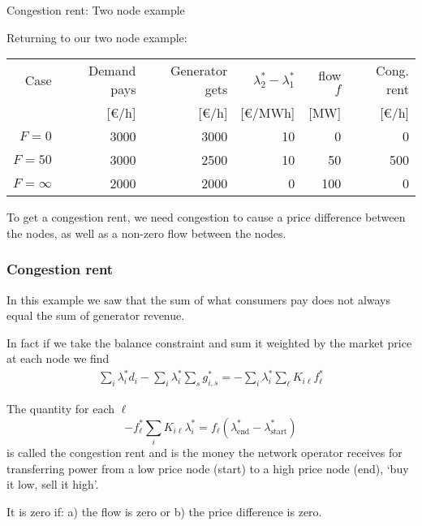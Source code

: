 \documentclass[10pt,aspectratio=169,dvipsnames]{beamer}
\newcommand{\ra}[1]{\renewcommand{\arraystretch}{#1}}
\def\l{\lambda}
\begin{document}
\begin{frame}{Congestion rent: Two node example}

  Returning to our two node example:
  \ra{1.1}
  \begin{table}[!t]
    \begin{tabular}{rrrrrr}
      \toprule
      Case & Demand pays & Generator gets & $\l_2^* - \l_1^*$ & flow $f$ & Cong. rent \\
       & [\euro/h] & [\euro/h] & [\euro/MWh] & [MW] & [\euro/h] \\
      \midrule
      $F = 0$ & 3000 & 3000 & 10 & 0 & 0 \\
      $F = 50$ & 3000 & 2500 & 10 & 50 & 500 \\
      $F = \infty$ & 2000 & 2000 & 0 & 100 & 0 \\
      \bottomrule
    \end{tabular}
  \end{table}

To get a congestion rent, we need congestion to cause a price
difference between the nodes, as well as a non-zero flow between the
nodes.

\end{frame}



\begin{frame}[fragile]
  \frametitle{Congestion rent}

  In this example we saw that the sum of what consumers pay does not always equal the sum of generator revenue.

  In fact if we take the balance constraint and sum it weighted by the market price at each node we find
  \begin{align*}
    \sum_i \l_i^* d_i -   \sum_i \l_i^* \sum_{s} g^*_{i,s} = -\sum_i \l_i^* \sum_\ell K_{i\ell}f^*_\ell
  \end{align*}

  The quantity for each $\ell$
  \begin{equation*}
    -f_\ell^*\sum_i K_{i\ell} \l_i^* = f_\ell (\l_{\textrm{end}}^* - \l_{\textrm{start}}^*)
  \end{equation*}
  is called the \alert{congestion rent} and is the money the network
  operator receives for transferring power from a low price node (start)
  to a high price node (end), `buy it low, sell it high'.

  It is zero if: a) the flow is zero or b) the price difference is zero.

\end{frame}
\end{document}
